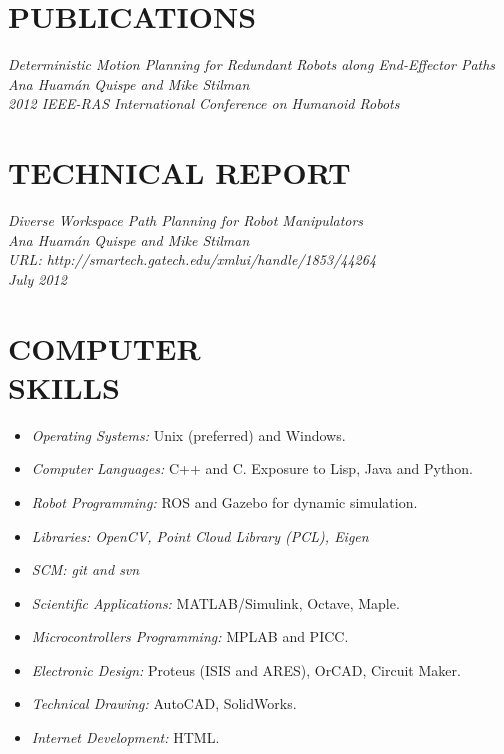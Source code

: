 \documentclass[margin]{res}
\begin{document}
\begin{resume}
\section{PUBLICATIONS}

                \sl Deterministic Motion Planning for Redundant Robots along End-Effector Paths \\
                \textit{Ana Huam\'{a}n Quispe and Mike Stilman} \\
                \textit{2012 IEEE-RAS International Conference on Humanoid Robots} 
				
\section{TECHNICAL REPORT}
				\sl  Diverse Workspace Path Planning for Robot Manipulators \\ 
                \textit{Ana Huam\'{a}n Quispe and Mike Stilman} \\
                \textit{URL: http://smartech.gatech.edu/xmlui/handle/1853/44264}\\
	            \textit{July 2012}  

\section{COMPUTER \\ SKILLS} 
                 \begin{itemize}  \itemsep -2pt %
                 \item{\sl Operating Systems:} Unix (preferred) and Windows. 
                 \item{\sl Computer Languages:} C++ and C. Exposure to Lisp, Java and Python.
                 \item{\sl Robot Programming:} ROS and Gazebo for dynamic simulation.
                 \item{\sl Libraries: OpenCV, Point Cloud Library (PCL), Eigen}
				\item{\sl SCM: git and svn}
				\item{\sl Scientific Applications:} MATLAB/Simulink, Octave, Maple.
                 \item{\sl Microcontrollers Programming:} MPLAB and PICC.
                 \item{\sl Electronic Design:} Proteus (ISIS and ARES), OrCAD, Circuit Maker.
                 \item{\sl Technical Drawing:} AutoCAD, SolidWorks.
                 \item{\sl Internet Development:} HTML. 
                 \end{itemize}



\end{resume}
\end{document}
